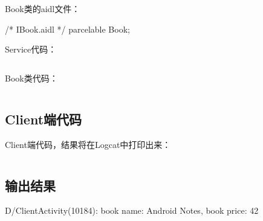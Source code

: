 ﻿\documentclass[a4paper,11pt]{article}
\begin{document}
  Book类的aidl文件：\par
  \begin{javacode}
/* IBook.aidl */
parcelable Book;
  \end{javacode}
  
  Service代码：\par
  \inputminted[linenos,tabsize=4,bgcolor=srcbg]{java}{AIDLServerService.java}
  
  Book类代码：\par
  \inputminted[linenos,tabsize=4,bgcolor=srcbg]{java}{Book.java}
  
  \subsection[Client端代码]{Client端代码}
  Client端代码，结果将在Logcat中打印出来：\par
  \inputminted[linenos,tabsize=4,bgcolor=srcbg]{java}{ClientActivity.java}
  
  \subsection[输出结果]{输出结果}
  \begin{bashcode}
D/ClientActivity(10184): book name: Android Notes, book price: 42
  \end{bashcode}
\end{document}
